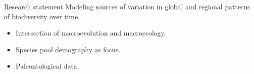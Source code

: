 \documentclass{beamer}
\begin{document}
\begin{frame}
  \begin{block}{Research statement}
    Modeling sources of variation in global and regional patterns of biodiversity over time.
    \begin{itemize}
      \item Intersection of macroevolution and macroecology. 
      \item Species pool demography as focus.
      \item Paleontological data.
    \end{itemize}
  \end{block}
\end{frame}
\end{document}
